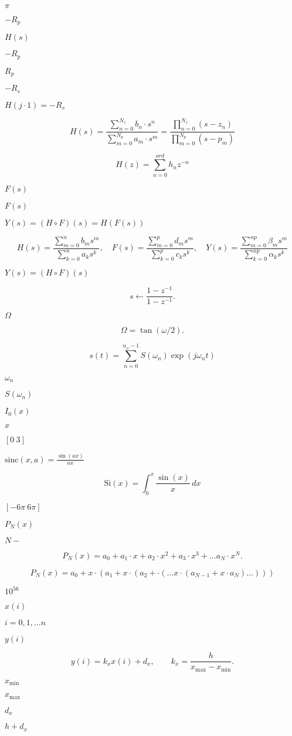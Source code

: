 \documentclass{article}
\begin{document}
$\pi$
\pagebreak

$ -R_p $
\pagebreak

$ H(s)$
\pagebreak

$-R_p$
\pagebreak

$ R_p $
\pagebreak

$-R_s$
\pagebreak

$H(j\cdot 1) = -R_s$
\pagebreak

\[ H(s) = \frac{\sum_{n = 0}^{N_z} b_n \cdot s^n}{\sum_{m = 0}^{N_p} a_m \cdot s^m} = \frac{\prod_{n = 0}^{N_z}(s-z_n)}{\prod_{m = 0}^{N_p} (s-p_m)} \]
\pagebreak

\[ H(z) = \sum_{n = 0}^{ord} h_n z^{-n} \]
\pagebreak

$ F(s) $
\pagebreak

$F(s)$
\pagebreak

$Y(s) = (H \circ F)(s) = H(F(s))$
\pagebreak

\[ H(s) = \frac{\sum\limits_{m = 0}^{n} b_m s^m} {\sum\limits_{k = 0}^{n} a_k s^k}, \quad F(s) = \frac{\sum\limits_{m = 0}^{p} d_m s^m} {\sum\limits_{k = 0}^{p} c_k s^k}, \quad Y(s) = \frac{\sum\limits_{m = 0}^{n p} \beta_m s^m} {\sum\limits_{k = 0}^{n p} \alpha_k s^k} \]
\pagebreak

$Y(s) = (H \circ F)(s)$
\pagebreak

\[ s \leftarrow \frac{1 - z^{-1}}{1 - z^{-1}}. \]
\pagebreak

$\Omega$
\pagebreak

\[ \Omega = \tan(\omega / 2). \]
\pagebreak

\[ s(t) = \sum\limits_{n = 0}^{n_{\omega}-1} S(\omega_n) \exp(j\omega_n t) \]
\pagebreak

$\omega_n$
\pagebreak

$S(\omega_n)$
\pagebreak

$ I_0(x)$
\pagebreak

$ x $
\pagebreak

$[0 \ 3]$
\pagebreak

$ \textrm{sinc}(x,a) = \frac{\sin(ax)}{ax}$
\pagebreak

\[ \textrm{Si}(x) = \int_{0}^{x} \frac{\sin(x)}{x} \, dx\]
\pagebreak

$[-6\pi \ 6\pi]$
\pagebreak

$P_N(x)$
\pagebreak

$N-$
\pagebreak

\[ P_N(x) = a_0 + a_1 \cdot x + a_2 \cdot x^2 + a_3 \cdot x^3 + ... a_N \cdot x^N. \]
\pagebreak

\[ P_N(x) = a_0 + x \cdot (a_1 + x \cdot (a_2 + \cdot ( \ldots x \cdot (a_{N-1} + x\cdot a_N) \ldots ))) \]
\pagebreak

$10^{56}$
\pagebreak

$x(i)$
\pagebreak

$i = 0,1,\ldots n$
\pagebreak

$y(i)$
\pagebreak

\[ y(i) = k_x x(i) + d_x, \qquad k_x = \frac{h}{x_{\textrm{max}} - x_{\textrm{min}}}. \]
\pagebreak

$x_{\textrm{min}}$
\pagebreak

$x_{\textrm{max}}$
\pagebreak

$d_x$
\pagebreak

$h + d_x$
\pagebreak
\end{document}
